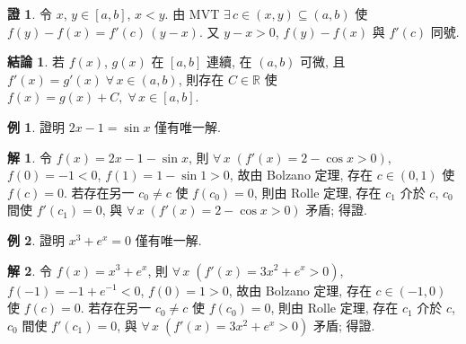 \documentclass[12pt]{extarticle}
\newcommand{\ds}{\displaystyle}
\theoremstyle{definition}
\newtheorem*{fact}{結論}
\newtheorem*{ex}{例}
\newtheorem*{sol}{解}
\newtheorem*{prf}{證}
\begin{document}
\begin{prf}
  令 $\ds x$, $y\in[a, b]$, $x < y$. 由 MVT $\ds\exists\,c\in(x, y)\subseteq(a, b)$ 使 $\ds f(y) - f(x) = f'(c)\,(y - x)$. 又 $y - x > 0$, $f(y) - f(x)$ 與 $f'(c)$ 同號.  
\end{prf}

\begin{fact}
  若 $f(x)$, $g(x)$ 在 $[a, b]$ 連續, 在 $(a, b)$ 可微, 且 $f'(x) = g'(x)\;\forall\,x\in(a, b)$, 則存在 $C\in\mathbb{R}$ 使 $f(x) = g(x) + C,\;\forall\,x\in[a, b]$. 
\end{fact}

\begin{ex}
  證明 $\ds 2x - 1 = \sin x$ 僅有唯一解. 
\end{ex}

\begin{sol}
  令 $\ds f(x) = 2 x - 1 - \sin x$, 則 $\ds\forall\,x\;(f'(x) = 2 - \cos x > 0)$, $f(0) = -1 < 0$, $f(1) = 1 - \sin 1 > 0$, 故由 Bolzano 定理, 存在 $\ds c\in(0, 1)$ 使 $f(c) = 0$. 若存在另一 $c_0\ne c$ 使 $f(c_0) = 0$, 則由 Rolle 定理, 存在 $c_1$ 介於 $c$, $c_0$ 間使 $f'(c_1) = 0$, 與 $\ds\forall\,x\;(f'(x) = 2 - \cos x > 0)$ 矛盾; 得證. 
\end{sol}

\begin{ex}
  證明 $\ds x^3 + e^x = 0$ 僅有唯一解. 
\end{ex}

\begin{sol}
  令 $\ds f(x) = x^3 + e^x$, 則 $\ds\forall\,x\;(f'(x) = 3 x^2 + e^x > 0)$, $f(-1) = -1 + e^{-1} < 0$, $f(0) = 1 > 0$, 故由 Bolzano 定理, 存在 $\ds c\in(-1, 0)$ 使 $f(c) = 0$. 若存在另一 $c_0\ne c$ 使 $f(c_0) = 0$, 則由 Rolle 定理, 存在 $c_1$ 介於 $c$, $c_0$ 間使 $f'(c_1) = 0$, 與 $\ds\forall\,x\;(f'(x) = 3 x^2 + e^x > 0)$ 矛盾; 得證. 
\end{sol}
\end{document}
